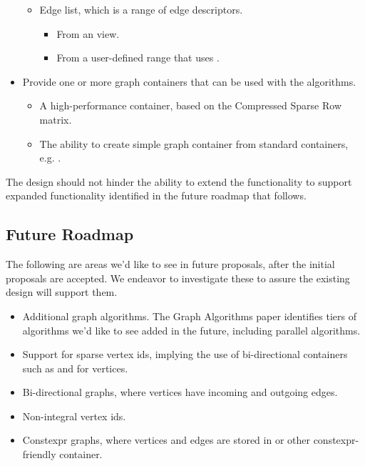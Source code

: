 \begin{itemize}
\begin{itemize}
                  \item Edge list, which is a range of edge descriptors.
                        \begin{itemize}
                              \item From an  view.
                              \item From a user-defined range that uses .
                        \end{itemize}
            \end{itemize}
      \item Provide one or more graph containers that can be used with the algorithms.
            \begin{itemize}
                  \item A high-performance  container, based on the Compressed Sparse Row matrix.
                  \item The ability to create simple graph container from standard containers, e.g. .
            \end{itemize}
\end{itemize}

The design should not hinder the ability to extend the functionality to support expanded functionality identified in the future roadmap
that follows.

\subsection{Future Roadmap}

The following are areas we'd like to see in future proposals, after the initial proposals are accepted. We endeavor to investigate
these to assure the existing design will support them.
\begin{itemize}
      \item Additional graph algorithms. The Graph Algorithms paper identifies tiers of algorithms we'd like to see added in the future, 
            including parallel algorithms.
      \item Support for sparse vertex ids, implying the use of bi-directional containers such as  and  for vertices.
      \item Bi-directional graphs, where vertices have incoming and outgoing edges.
      \item Non-integral vertex ids.
      \item Constexpr graphs, where vertices and edges are stored in  or other constexpr-friendly container.
\end{itemize}


